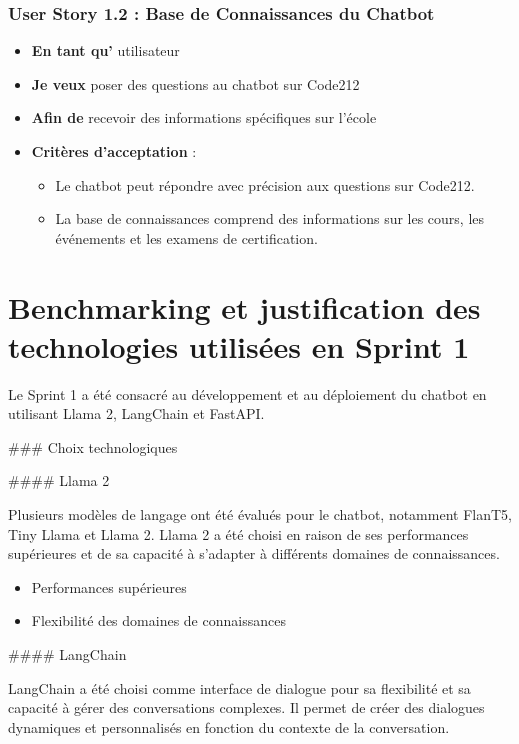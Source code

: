 \documentclass[a4paper, 11pt, openany]{report}
\begin{document}
\subsubsection{User Story 1.2 : Base de Connaissances du Chatbot}

\begin{itemize}
    \item \textbf{En tant qu'} utilisateur
    \item \textbf{Je veux} poser des questions au chatbot sur Code212
    \item \textbf{Afin de} recevoir des informations spécifiques sur l’école
    \item \textbf{Critères d’acceptation} :
    \begin{itemize}
        \item Le chatbot peut répondre avec précision aux questions sur Code212.
        \item La base de connaissances comprend des informations sur les cours, les événements et les examens de certification.
    \end{itemize}
\end{itemize}

\section{Benchmarking et justification des technologies utilisées en Sprint 1}

Le Sprint 1 a été consacré au développement et au déploiement du chatbot en utilisant Llama 2, LangChain et FastAPI.

### Choix technologiques

#### Llama 2

Plusieurs modèles de langage ont été évalués pour le chatbot, notamment FlanT5, Tiny Llama et Llama 2. Llama 2 a été choisi en raison de ses performances supérieures et de sa capacité à s'adapter à différents domaines de connaissances.

\begin{itemize}
\item Performances supérieures
\item Flexibilité des domaines de connaissances
\end{itemize}

#### LangChain

LangChain a été choisi comme interface de dialogue pour sa flexibilité et sa capacité à gérer des conversations complexes. Il permet de créer des dialogues dynamiques et personnalisés en fonction du contexte de la conversation.
\end{document}
